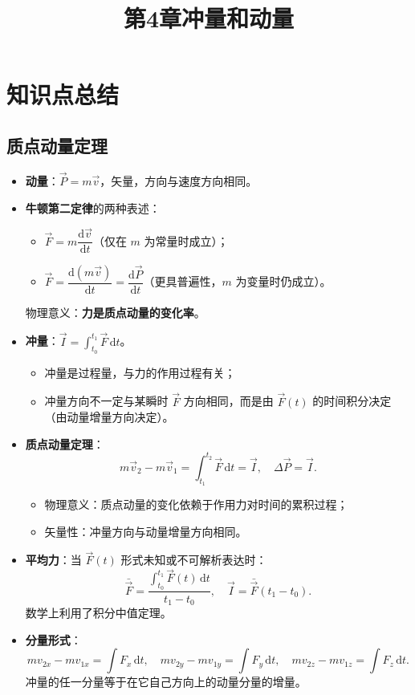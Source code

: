 \documentclass[12pt,a4paper]{ctexart}
\title{第4章\quad 冲量和动量}
\author{}
\date{}
\begin{document}
\maketitle

\section{知识点总结}

\subsection{质点动量定理}

\begin{itemize}
    \item \textbf{动量}：$\vec{P} = m\vec{v}$，矢量，方向与速度方向相同。
    \item \textbf{牛顿第二定律}的两种表述：
    \begin{itemize}
        \item $\vec{F} = m\dfrac{\mathrm{d}\vec{v}}{\mathrm{d}t}$（仅在 $m$ 为常量时成立）；
        \item $\vec{F} = \dfrac{\mathrm{d}(m\vec{v})}{\mathrm{d}t} = \dfrac{\mathrm{d}\vec{P}}{\mathrm{d}t}$（更具普遍性，$m$ 为变量时仍成立）。
    \end{itemize}
    物理意义：\textbf{力是质点动量的变化率}。
    \item \textbf{冲量}：$\vec{I} = \displaystyle\int_{t_0}^{t_1} \vec{F}\,\mathrm{d}t$。
    \begin{itemize}
        \item 冲量是过程量，与力的作用过程有关；
        \item 冲量方向不一定与某瞬时 $\vec{F}$ 方向相同，而是由 $\vec{F}(t)$ 的时间积分决定（由动量增量方向决定）。
    \end{itemize}
    \item \textbf{质点动量定理}：
    \[
        m\vec{v}_2 - m\vec{v}_1 = \int_{t_1}^{t_2}\vec{F}\,\mathrm{d}t = \vec{I},
        \quad \Delta\vec{P} = \vec{I}.
    \]
    \begin{itemize}
        \item 物理意义：质点动量的变化依赖于作用力对时间的累积过程；
        \item 矢量性：冲量方向与动量增量方向相同。
    \end{itemize}
    \item \textbf{平均力}：当 $\vec{F}(t)$ 形式未知或不可解析表达时：
    \[
        \bar{\vec{F}} = \frac{\displaystyle\int_{t_0}^{t_1}\vec{F}(t)\,\mathrm{d}t}{t_1 - t_0},\quad \vec{I} = \bar{\vec{F}}(t_1 - t_0).
    \]
    数学上利用了积分中值定理。
    \item \textbf{分量形式}：
    \[
        mv_{2x} - mv_{1x} = \int F_x\,\mathrm{d}t,\quad
        mv_{2y} - mv_{1y} = \int F_y\,\mathrm{d}t,\quad
        mv_{2z} - mv_{1z} = \int F_z\,\mathrm{d}t.
    \]
    冲量的任一分量等于在它自己方向上的动量分量的增量。
\end{itemize}
\end{document}

